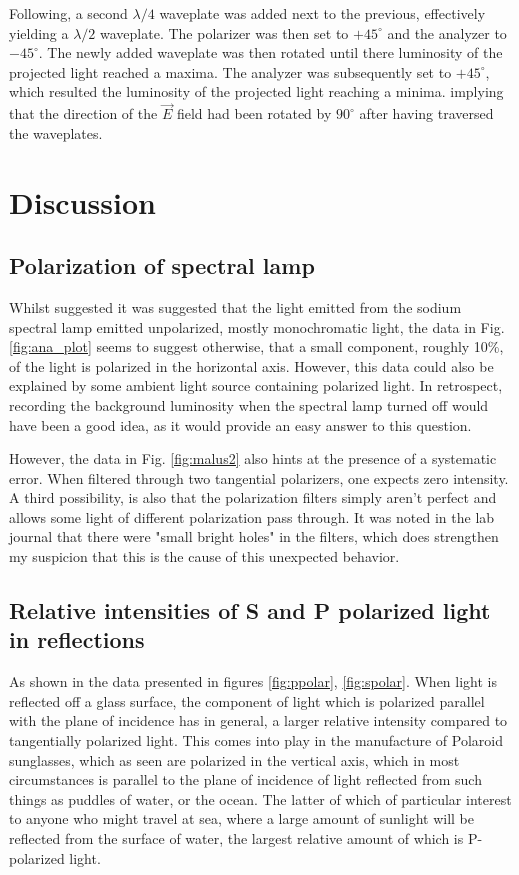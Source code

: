 \documentclass[%
 reprint,
 amsmath,amssymb,
 aps,
]{revtex4-1}
\begin{document}
    Following, a second $\lambda/4$ waveplate was added next to the previous, effectively yielding a $\lambda/2$ waveplate. The polarizer was then set to $+45^\circ$ and the analyzer to $-45^\circ$. The newly added waveplate was then rotated until there luminosity of the projected light reached a maxima. The analyzer was subsequently set to $+45^\circ$, which resulted the luminosity of the projected light reaching a minima. implying that the direction of the $\vec E$ field had been rotated by $90^\circ$ after having traversed the waveplates.

\section{\label{sect:discuss}Discussion}
  \subsection{Polarization of spectral lamp}
    Whilst suggested it was suggested that the light emitted from the sodium spectral lamp emitted unpolarized, mostly monochromatic light, the data in Fig. \ref{fig:ana_plot} seems to suggest otherwise, that a small component, roughly 10\%, of the light is polarized in the horizontal axis. However, this data could also be explained by some ambient light source containing polarized light. In retrospect, recording the background luminosity when the spectral lamp turned off would have been a good idea, as it would provide an easy answer to this question.

    However, the data in Fig. \ref{fig:malus2} also hints at the presence of a systematic error. When filtered through two tangential polarizers, one expects zero intensity. A third possibility, is also that the polarization filters simply aren't perfect and allows some light of different polarization pass through. It was noted in the lab journal that there were "small bright holes" in the filters, which does strengthen my suspicion that this is the cause of this unexpected behavior.

  \subsection{Relative intensities of S and P polarized light in reflections}
    As shown in the data presented in figures \ref{fig:ppolar}, \ref{fig:spolar}. When light is reflected off a glass surface, the component of light which is polarized parallel with the plane of incidence has in general, a larger relative intensity compared to tangentially polarized light. This comes into play in the manufacture of Polaroid sunglasses, which as seen are polarized in the vertical axis, which in most circumstances is parallel to the plane of incidence of light reflected from such things as puddles of water, or the ocean. The latter of which of particular interest to anyone who might travel at sea, where a large amount of sunlight will be reflected from the surface of water, the largest relative amount of which is P-polarized light.
\end{document}
